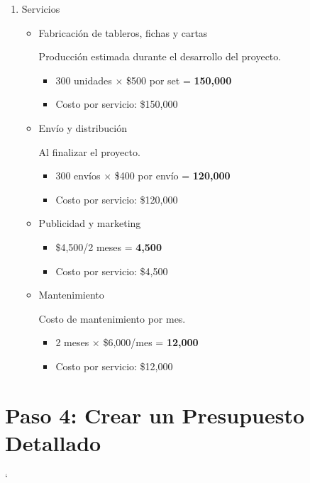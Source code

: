 \documentclass[12pt]{article}
\begin{document}
\begin{enumerate}
\begin{itemize}
	\end{itemize}

	

	\item Servicios

	\begin{itemize}

		\item Fabricación de tableros, fichas y cartas

		Producción estimada durante el desarrollo del proyecto.
		\begin{itemize}
            \item 300 unidades $\times$ \$500 por set = \textbf{150,000}
			\item Costo por servicio: \$150,000
        \end{itemize}

		\item Envío y distribución
		
		Al finalizar el proyecto.
		\begin{itemize}
            \item 300 envíos $\times$ \$400 por envío = \textbf{120,000}
            \item Costo por servicio: \$120,000
        \end{itemize}

		\item Publicidad y marketing

		\begin{itemize}
			\item \$4,500/2 meses = \textbf{4,500}
            \item Costo por servicio: \$4,500
        \end{itemize}

		\item Mantenimiento

		Costo de mantenimiento por mes.
		\begin{itemize}
            \item 2 meses $\times$ \$6,000/mes = \textbf{12,000}
            \item Costo por servicio: \$12,000
        \end{itemize}

	\end{itemize}

\end{enumerate}
    


 \section*{Paso 4: Crear un Presupuesto Detallado}
    

`
\end{document}
